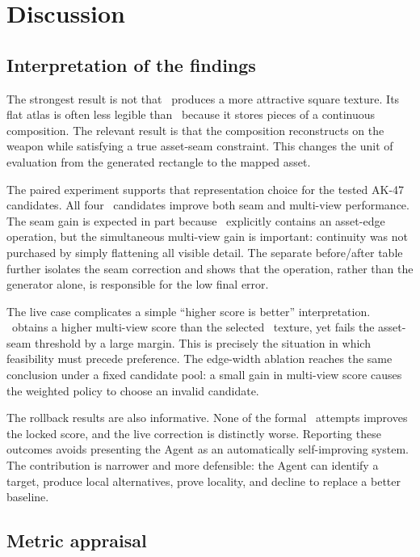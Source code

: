 \section{Discussion}
\label{sec:discussion}

\subsection{Interpretation of the findings}

The strongest result is not that \routeB\ produces a more attractive square
texture. Its flat atlas is often less legible than \routeA\ because it stores
pieces of a continuous composition. The relevant result is that the composition
reconstructs on the weapon while satisfying a true asset-seam constraint. This
changes the unit of evaluation from the generated rectangle to the mapped asset.

The paired experiment supports that representation choice for the tested AK-47
candidates. All four \routeB\ candidates improve both seam and multi-view
performance. The seam gain is expected in part because \routeB\ explicitly
contains an asset-edge operation, but the simultaneous multi-view gain is
important: continuity was not purchased by simply flattening all visible detail.
The separate before/after table further isolates the seam correction and shows
that the operation, rather than the generator alone, is responsible for the low
final error.

The live case complicates a simple ``higher score is better'' interpretation.
\routeA\ obtains a higher multi-view score than the selected \routeB\ texture, yet
fails the asset-seam threshold by a large margin. This is precisely the situation
in which feasibility must precede preference. The edge-width ablation reaches the
same conclusion under a fixed candidate pool: a small gain in multi-view score
causes the weighted policy to choose an invalid candidate.

The rollback results are also informative. None of the formal \routeC\ attempts
improves the locked score, and the live correction is distinctly worse. Reporting
these outcomes avoids presenting the Agent as an automatically self-improving
system. The contribution is narrower and more defensible: the Agent can identify a
target, produce local alternatives, prove locality, and decline to replace a
better baseline.

\subsection{Metric appraisal}

